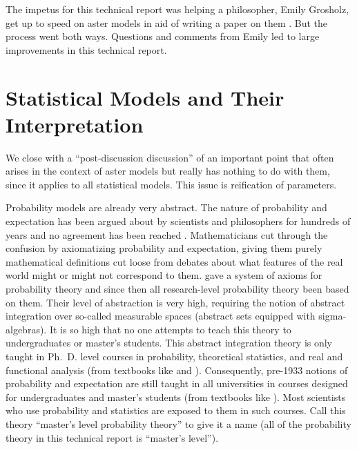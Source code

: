 \documentclass[11pt]{article}
\begin{document}
The impetus for this technical report was helping a philosopher,
Emily Grosholz, get up to speed on aster models in aid of writing a paper
on them \citep{grosholz}.  But the process went both ways.  Questions and
comments from Emily led to large improvements in this technical report.



\appendix

\section{Statistical Models and Their Interpretation}

We close with a ``post-discussion discussion'' of an important point that often
arises in the context of aster models but really has nothing to do with them,
since it applies to all statistical models.  This issue is reification
of parameters.

Probability models are already very abstract.  The nature of probability
and expectation has been argued about by scientists and philosophers for
hundreds of years and no agreement has been reached \citep{hajek}.
Mathematicians cut
through the confusion by axiomatizing probability and expectation, giving
them purely mathematical definitions cut loose from debates about what features
of the real world might or might not correspond to them.
\citet{kolmogorov-foundations} gave a system of axioms for probability theory
and since then all research-level probability theory been based on them.
Their level of abstraction is very high, requiring the notion of abstract
integration over so-called measurable spaces (abstract sets equipped with
sigma-algebras).  It is so high that no one attempts to teach this theory
to undergraduates or master's students.  This abstract integration theory
is only taught in Ph.~D. level courses in probability, theoretical statistics,
and real and functional analysis (from textbooks like \citealp{fristedt-gray}
and \citealp{rudin}).  Consequently, pre-1933 notions of
probability and expectation are still taught in all universities in courses
designed for undergraduates and master's students
(from textbooks like \citealp{casella-berger}).  Most scientists who use
probability and statistics are exposed to them in such courses.
Call this theory ``master's level probability theory'' to give it a name
(all of the probability theory in this technical report is ``master's level'').
\end{document}
